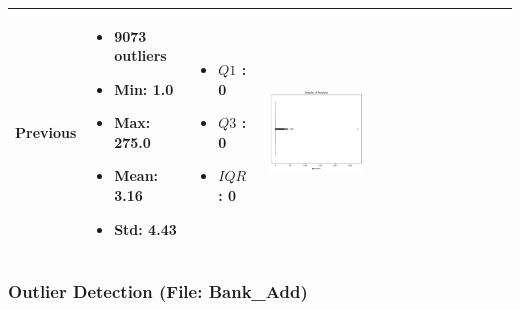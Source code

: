 \documentclass{article}
\begin{document}
\begin{longtable}{|p{}|p{}|p{}|p{}|}
            \hline
            \textbf{Previous} & 
            \begin{itemize}
                \item 9073 outliers
                \item Min: 1.0
                \item Max: 275.0
                \item Mean: 3.16
                \item Std: 4.43
            \end{itemize} & 
            \begin{itemize}
                \item $Q1$ : 0
                \item $Q3$ : 0
                \item $IQR$ : 0
            \end{itemize} &
            \includegraphics[width=0.40\textwidth]{data/bank_marketing/pic/Outlier/Previous.png} \\
            \hline
        \end{longtable}
           
        \vspace{100pt}
           
           \subsubsection{Outlier Detection (File: Bank\_Add)}
           
\end{document}
